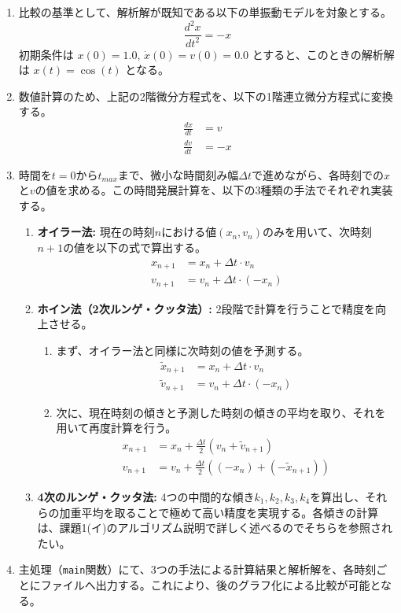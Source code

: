 \documentclass[dvipdfmx,a4paper]{jsarticle}
\newcommand{\code}[1]{\colorbox{inlinebackcolour}{\lstinline|#1|}}
\begin{document}
\begin{enumerate}
    \item 比較の基準として、解析解が既知である以下の単振動モデルを対象とする。
    $$
    \frac{d^2 x}{dt^2} = -x
    $$
    初期条件は $x(0) = 1.0$, $\dot{x}(0) = v(0) = 0.0$ とすると、このときの解析解は $x(t) = \cos(t)$ となる。

    \item 数値計算のため、上記の2階微分方程式を、以下の1階連立微分方程式に変換する。
    \begin{align*}
        \frac{dx}{dt} &= v \\
        \frac{dv}{dt} &= -x
    \end{align*}

    \item 時間を$t=0$から$t_{max}$まで、微小な時間刻み幅$\Delta t$で進めながら、各時刻での$x$と$v$の値を求める。この時間発展計算を、以下の3種類の手法でそれぞれ実装する。
    \begin{enumerate}
        \item \textbf{オイラー法:} 現在の時刻$n$における値$(x_n, v_n)$のみを用いて、次時刻$n+1$の値を以下の式で算出する。
        \begin{align*}
            x_{n+1} &= x_n + \Delta t \cdot v_n \\
            v_{n+1} &= v_n + \Delta t \cdot (-x_n)
        \end{align*}

        \item \textbf{ホイン法（2次ルンゲ・クッタ法）:} 2段階で計算を行うことで精度を向上させる。
        \begin{enumerate}
            \item まず、オイラー法と同様に次時刻の値を予測する。
            \begin{align*}
                \tilde{x}_{n+1} &= x_n + \Delta t \cdot v_n \\
                \tilde{v}_{n+1} &= v_n + \Delta t \cdot (-x_n)
            \end{align*}
            \item 次に、現在時刻の傾きと予測した時刻の傾きの平均を取り、それを用いて再度計算を行う。
            \begin{align*}
                x_{n+1} &= x_n + \frac{\Delta t}{2} (v_n + \tilde{v}_{n+1}) \\
                v_{n+1} &= v_n + \frac{\Delta t}{2} ((-x_n) + (-\tilde{x}_{n+1}))
            \end{align*}
        \end{enumerate}

        \item \textbf{4次のルンゲ・クッタ法:} 4つの中間的な傾き$k_1, k_2, k_3, k_4$を算出し、それらの加重平均を取ることで極めて高い精度を実現する。各傾きの計算は、課題1(イ)のアルゴリズム説明で詳しく述べるのでそちらを参照されたい。
    \end{enumerate}

    \item 主処理（\code{main}関数）にて、3つの手法による計算結果と解析解を、各時刻ごとにファイルへ出力する。これにより、後のグラフ化による比較が可能となる。
\end{enumerate}
\end{document}
